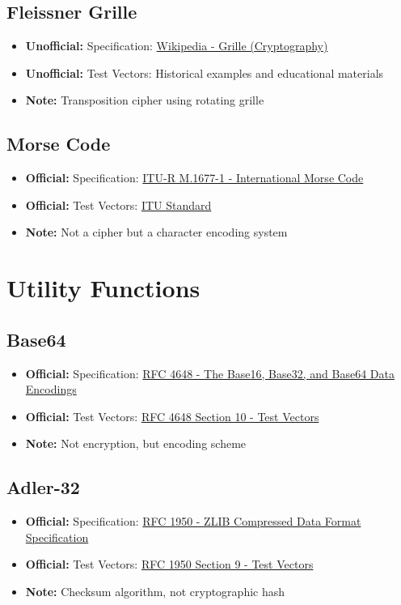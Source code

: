 \documentclass[12pt,a4paper]{article}
\newcommand{\official}[1]{\textcolor{citegreen}{\textbf{Official:}} #1}
\newcommand{\unofficial}[1]{\textcolor{warningred}{\textbf{Unofficial:}} #1}
\newcommand{\note}[1]{\textcolor{noteorange}{\textbf{Note:}} #1}
\newcommand{\link}[2]{\href{#1}{#2}}
\begin{document}
\subsection{Fleissner Grille}
\begin{itemize}
    \item \unofficial{Specification:} \link{https://en.wikipedia.org/wiki/Grille_(cryptography)}{Wikipedia - Grille (Cryptography)}
    \item \unofficial{Test Vectors:} Historical examples and educational materials
    \item \note{Transposition cipher using rotating grille}
\end{itemize}

\subsection{Morse Code}
\begin{itemize}
    \item \official{Specification:} \link{https://www.itu.int/rec/R-REC-M.1677-1-200910-I/}{ITU-R M.1677-1 - International Morse Code}
    \item \official{Test Vectors:} \link{https://www.itu.int/rec/R-REC-M.1677-1-200910-I/}{ITU Standard}
    \item \note{Not a cipher but a character encoding system}
\end{itemize}

\newpage

\section{Utility Functions}

\subsection{Base64}
\begin{itemize}
    \item \official{Specification:} \link{https://tools.ietf.org/html/rfc4648}{RFC 4648 - The Base16, Base32, and Base64 Data Encodings}
    \item \official{Test Vectors:} \link{https://tools.ietf.org/html/rfc4648#section-10}{RFC 4648 Section 10 - Test Vectors}
    \item \note{Not encryption, but encoding scheme}
\end{itemize}

\subsection{Adler-32}
\begin{itemize}
    \item \official{Specification:} \link{https://tools.ietf.org/html/rfc1950}{RFC 1950 - ZLIB Compressed Data Format Specification}
    \item \official{Test Vectors:} \link{https://tools.ietf.org/html/rfc1950#section-9}{RFC 1950 Section 9 - Test Vectors}
    \item \note{Checksum algorithm, not cryptographic hash}
\end{itemize}
\end{document}
